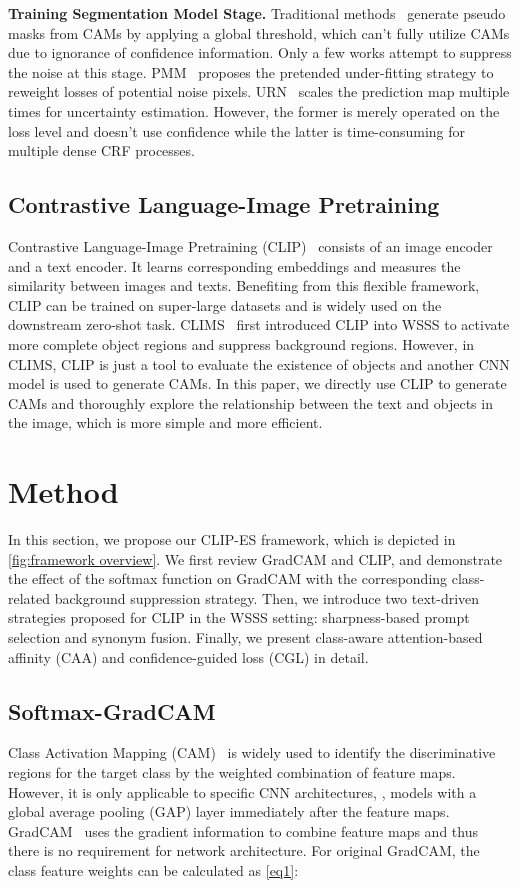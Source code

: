 \documentclass[10pt,twocolumn,letterpaper]{article}
\begin{document}
\textbf{Training Segmentation Model Stage.} Traditional methods~\cite{Lee2021EPS,jiang2022l2g} generate pseudo masks from CAMs by applying a global threshold, which can't fully utilize CAMs due to ignorance of confidence information. 
Only a few works attempt to suppress the noise at this stage. PMM~\cite{li2021pseudo_matters} proposes the pretended under-fitting strategy to reweight losses of potential noise pixels. URN~\cite{Li2022URN} scales the prediction map multiple times for uncertainty estimation. However, the former is merely operated on the loss level and doesn't use confidence while the latter is time-consuming for multiple dense CRF processes. 


\subsection{Contrastive Language-Image Pretraining}

Contrastive Language-Image Pretraining (CLIP)~\cite{CLIP} consists of an image encoder and a text encoder. It learns corresponding embeddings and measures the similarity between images and texts. Benefiting from this flexible framework, CLIP can be trained on super-large datasets and is widely used on the downstream zero-shot task.
CLIMS~\cite{Xie_2022_CLIMS} first introduced CLIP into WSSS to activate more complete object regions and suppress background regions. However, in CLIMS, CLIP is just a tool to evaluate the existence of objects and another CNN model is used to generate CAMs. In this paper, we directly use CLIP to generate CAMs and thoroughly explore the relationship between the text and objects in the image, which is more simple and more efficient.



\section{Method}
\label{sec:method}
In this section, we propose our CLIP-ES framework, which is depicted in \cref{fig:framework overview}. We first review GradCAM and CLIP, and demonstrate the effect of the softmax function on GradCAM with the corresponding class-related background suppression strategy. 
Then, we introduce two text-driven strategies proposed for CLIP in the WSSS setting: sharpness-based prompt selection and synonym fusion. Finally, we present class-aware attention-based affinity (CAA) and confidence-guided loss (CGL) in detail.

\subsection{Softmax-GradCAM}
\label{sec3.1}
Class Activation Mapping (CAM)~\cite{cam} is widely used to identify the discriminative regions for the target class by the weighted combination of feature maps. However, it is only applicable to specific CNN architectures, \eg, models with a global average pooling (GAP) layer immediately after the feature maps. 
GradCAM~\cite{gradcam} uses the gradient information to combine feature maps and thus there is no requirement for network architecture. For original GradCAM, the class feature weights can be calculated as \cref{eq1}:
\end{document}
